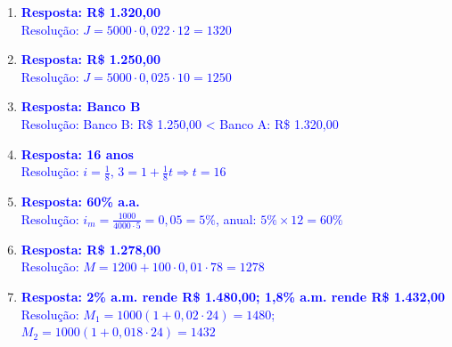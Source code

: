 \documentclass[11pt]{article}
\begin{document}
\begin{multicols}{2}
\begin{enumerate}[leftmargin=*, itemsep=2pt]
\item \textcolor{blue}{\textbf{Resposta: R\$ 1.320,00}} \\
\textcolor{blue}{Resolução: $J = 5000 \cdot 0,022 \cdot 12 = 1320$}

\item \textcolor{blue}{\textbf{Resposta: R\$ 1.250,00}} \\
\textcolor{blue}{Resolução: $J = 5000 \cdot 0,025 \cdot 10 = 1250$}

\item \textcolor{blue}{\textbf{Resposta: Banco B}} \\
\textcolor{blue}{Resolução: Banco B: R\$ 1.250,00 < Banco A: R\$ 1.320,00}

\item \textcolor{blue}{\textbf{Resposta: 16 anos}} \\
\textcolor{blue}{Resolução: $i = \frac{1}{8}$, $3 = 1 + \frac{1}{8}t \Rightarrow t = 16$}

\item \textcolor{blue}{\textbf{Resposta: 60\% a.a.}} \\
\textcolor{blue}{Resolução: $i_m = \frac{1000}{4000 \cdot 5} = 0,05 = 5\%$, anual: $5\% \times 12 = 60\%$}

\item \textcolor{blue}{\textbf{Resposta: R\$ 1.278,00}} \\
\textcolor{blue}{Resolução: $M = 1200 + 100 \cdot 0,01 \cdot 78 = 1278$}

\item \textcolor{blue}{\textbf{Resposta: 2\% a.m. rende R\$ 1.480,00; 1,8\% a.m. rende R\$ 1.432,00}} \\
\textcolor{blue}{Resolução: $M_1 = 1000(1 + 0,02 \cdot 24) = 1480$; $M_2 = 1000(1 + 0,018 \cdot 24) = 1432$}

\end{enumerate}

\end{multicols}
\end{document}
